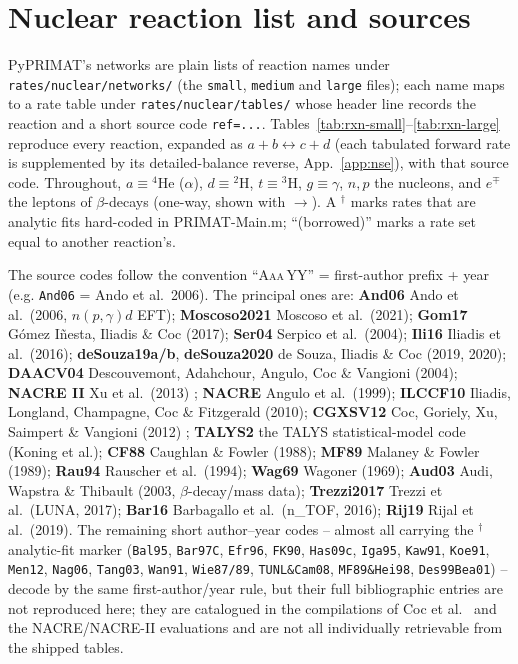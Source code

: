 \documentclass[11pt,a4paper]{article}
\newcommand{\code}[1]{\texttt{#1}}
\begin{document}
\section{Nuclear reaction list and sources}\label{app:reactions}
PyPRIMAT's networks are plain lists of reaction names under
\code{rates/nuclear/networks/} (the \code{small}, \code{medium} and
\code{large} files); each name maps to a rate table under
\code{rates/nuclear/tables/} whose header line records the
reaction and a short source code \code{ref=...}.
Tables~\ref{tab:rxn-small}--\ref{tab:rxn-large} reproduce every reaction,
expanded as $a+b\leftrightarrow c+d$ (each tabulated forward rate is supplemented
by its detailed-balance reverse, App.~\ref{app:nse}), with that source code.
Throughout, $a\equiv{}^4$He ($\alpha$), $d\equiv{}^2$H, $t\equiv{}^3$H,
$g\equiv\gamma$, $n,p$ the nucleons, and $e^\mp$ the leptons of $\beta$-decays
(one-way, shown with $\to$). A $^\dagger$ marks rates that are analytic fits
hard-coded in PRIMAT-Main.m; ``(borrowed)'' marks a rate set equal to another
reaction's.

The source codes follow the convention ``\textsc{Aaa}\,YY'' = first-author
prefix + year (e.g. \texttt{And06} = Ando et al.\ 2006). The principal ones are:
\textbf{And06} Ando et al.\ (2006, $n(p,\gamma)d$ EFT);
\textbf{Moscoso2021} Moscoso et al.\ (2021);
\textbf{Gom17} G\'omez I\~nesta, Iliadis \& Coc (2017);
\textbf{Ser04} Serpico et al.\ (2004);
\textbf{Ili16} Iliadis et al.\ (2016);
\textbf{deSouza19a/b}, \textbf{deSouza2020} de Souza, Iliadis \& Coc (2019, 2020);
\textbf{DAACV04} Descouvemont, Adahchour, Angulo, Coc \& Vangioni (2004);
\textbf{NACRE II} Xu et al.\ (2013) \cite{NACRE2};
\textbf{NACRE} Angulo et al.\ (1999);
\textbf{ILCCF10} Iliadis, Longland, Champagne, Coc \& Fitzgerald (2010);
\textbf{CGXSV12} Coc, Goriely, Xu, Saimpert \& Vangioni (2012) \cite{Coc2012};
\textbf{TALYS2} the TALYS statistical-model code (Koning et al.);
\textbf{CF88} Caughlan \& Fowler (1988);
\textbf{MF89} Malaney \& Fowler (1989);
\textbf{Rau94} Rauscher et al.\ (1994);
\textbf{Wag69} Wagoner (1969);
\textbf{Aud03} Audi, Wapstra \& Thibault (2003, $\beta$-decay/mass data);
\textbf{Trezzi2017} Trezzi et al.\ (LUNA, 2017);
\textbf{Bar16} Barbagallo et al.\ (n\_TOF, 2016);
\textbf{Rij19} Rijal et al.\ (2019).
The remaining short author--year codes -- almost all carrying the $^\dagger$
analytic-fit marker (\texttt{Bal95}, \texttt{Bar97C}, \texttt{Efr96},
\texttt{FK90}, \texttt{Has09c}, \texttt{Iga95}, \texttt{Kaw91}, \texttt{Koe91},
\texttt{Men12}, \texttt{Nag06}, \texttt{Tang03}, \texttt{Wan91},
\texttt{Wie87/89}, \texttt{TUNL\&Cam08}, \texttt{MF89\&Hei98},
\texttt{Des99Bea01}) -- decode by the same first-author/year rule, but their
full bibliographic entries are not reproduced here; they are catalogued in the
compilations of Coc et al.\ \cite{Coc2012} and the NACRE/NACRE-II evaluations
\cite{NACRE2} and are not all individually retrievable from the shipped tables.
\end{document}
